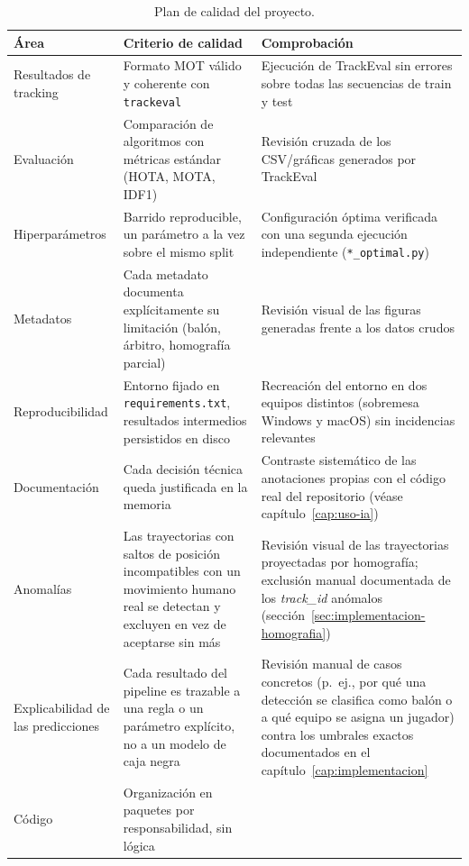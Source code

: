 \begin{table}[htp]
\centering
\caption{Plan de calidad del proyecto.}
\label{tab:gestion-calidad}
\renewcommand{\arraystretch}{1.05}
\footnotesize
\begin{tabular}{|p{2.6cm}|p{4.5cm}|p{4.9cm}|}
\hline
\rowcolor{gray!25}
\textbf{Área} & \textbf{Criterio de calidad} & \textbf{Comprobación} \\
\hline
Resultados de tracking & Formato MOT válido y coherente con
  \texttt{trackeval} & Ejecución de TrackEval sin errores sobre todas las
  secuencias de train y test \\
\hline
Evaluación & Comparación de algoritmos con métricas estándar
  (HOTA, MOTA, IDF1) & Revisión cruzada de los CSV/gráficas generados por
  TrackEval \\
\hline
Hiperparámetros & Barrido reproducible, un parámetro a la vez sobre el
  mismo split & Configuración óptima verificada con una segunda ejecución
  independiente (\texttt{*\_optimal.py}) \\
\hline
Metadatos & Cada metadato documenta explícitamente su limitación (balón,
  árbitro, homografía parcial) & Revisión visual de las figuras generadas
  frente a los datos crudos \\
\hline
Reproducibilidad & Entorno fijado en \texttt{requirements.txt}, resultados
  intermedios persistidos en disco & Recreación del entorno en dos equipos
  distintos (sobremesa Windows y macOS) sin incidencias relevantes \\
\hline
Documentación & Cada decisión técnica queda justificada en la memoria &
  Contraste sistemático de las anotaciones propias con el código real del
  repositorio (véase capítulo~\ref{cap:uso-ia}) \\
\hline
Anomalías & Las trayectorias con saltos de posición incompatibles con un
  movimiento humano real se detectan y excluyen en vez de aceptarse sin
  más & Revisión visual de las trayectorias proyectadas por homografía;
  exclusión manual documentada de los \emph{track\_id} anómalos
  (sección~\ref{sec:implementacion-homografia}) \\
\hline
Explicabilidad de las predicciones & Cada resultado del pipeline es
  trazable a una regla o un parámetro explícito, no a un modelo de caja
  negra & Revisión manual de casos concretos (p.\ ej., por qué una
  detección se clasifica como balón o a qué equipo se asigna un jugador)
  contra los umbrales exactos documentados en el
  capítulo~\ref{cap:implementacion} \\
\hline
Código & Organización en paquetes por responsabilidad, sin lógica

\end{tabular}
\end{table}

